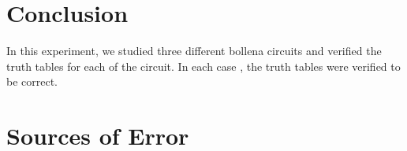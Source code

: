 \documentclass[12pt]{article}
\begin{document}
\section{Conclusion}
In this experiment, we studied three different bollena circuits and verified the truth tables for each of the circuit. In each case , the truth tables were verified to be correct.

\section{Sources of Error}
\end{document}
